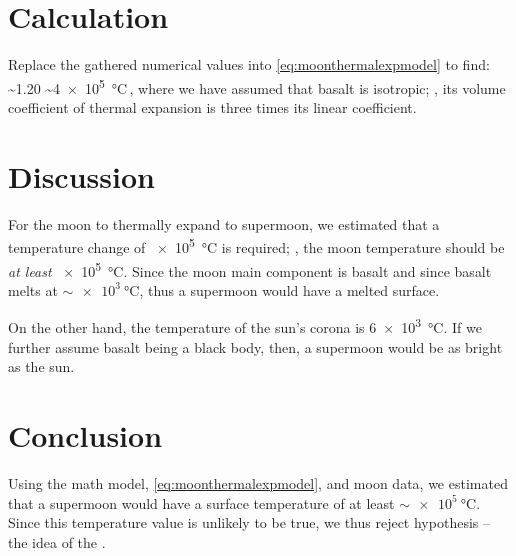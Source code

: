 \section{Calculation}
%
Replace the gathered numerical values into \cref{eq:moonthermalexpmodel} to find:
%
\beq
  \Dx\temp \sim 1.20
           \sim \SI{4e5}{\celsius}\,,
\eeq
%
where we have assumed that basalt is isotropic; \ie, its volume coefficient of thermal expansion is three times its linear coefficient. 


\section{Discussion}
%
For the moon to thermally expand to supermoon, we estimated that a temperature change of \SI{e5}{\celsius} is required; \ie, the moon temperature should be \emph{at least} \SI{e5}{\celsius}. Since the moon main component is basalt and since basalt melts at $\sim\SI{e3}{\celsius}$, thus a supermoon would have a melted surface.

On the other hand, the temperature of the sun's corona is \SI{6e3}{\celsius}. If we further assume basalt being a black body, then, a supermoon would be as bright as the sun. 


\section{Conclusion}
%
Using the math model, \cref{eq:moonthermalexpmodel}, and moon data, we estimated that a supermoon would have a surface temperature of at least $\sim\SI{e5}{\celsius}$. Since this temperature value is unlikely to be true, we thus reject hypothesis -- the idea of the .
